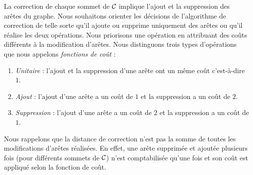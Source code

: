 La correction de chaque sommet de ${\cal C}$ implique l'ajout et la suppression des ar\^etes du graphe. Nous souhaitons orienter les d\'ecisions de l'algorithme de correction de telle sorte qu'il ajoute  ou supprime uniquement des ar\^etes ou 
qu'il r\'ealise les deux op\'erations.
 Nous  priorisons une op\'eration en attribuant des co\^uts diff\'erents \`a  la modification d'ar\^etes.
Nous distinguons trois types d'op\'erations que nous appelons {\em fonctions de co\^ut} :
\begin{enumerate}[label=(\roman*)]
\item {\em Unitaire} : l'ajout et la suppression d'une ar\^ete ont un m\^eme co\^ut c'est-\`a-dire $1$.
\item {\em Ajout} : l'ajout d'une ar\^ete a un co\^ut de $1$ et la suppression a un co\^ut de $2$.
\item {\em Suppression} : l'ajout d'une ar\^ete a un co\^ut de $2$ et la suppression a un co\^ut de $1$.
\end{enumerate}
Nous rappelons que la distance de correction n'est pas la somme de toutes les  modifications d'ar\^etes r\'ealis\'ees. En effet, une ar\^ete  supprim\'ee et ajout\'ee plusieurs fois (pour diff\'erents sommets de ${\cal C}$) n'est comptabilis\'ee qu'une fois et son co\^ut est appliqu\'e selon la fonction de co\^ut.
\newline


